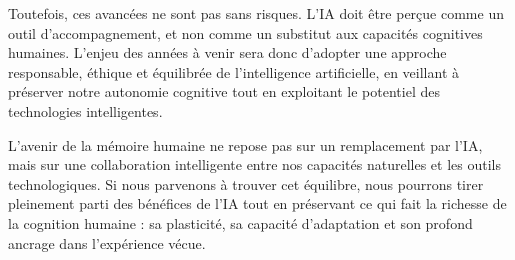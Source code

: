 \documentclass[12pt,a4paper]{report}
\begin{document}
Toutefois, ces avancées ne sont pas sans risques. L’IA doit être perçue comme un outil d’accompagnement, et non comme un substitut aux capacités cognitives humaines. L’enjeu des années à venir sera donc d’adopter une approche responsable, éthique et équilibrée de l’intelligence artificielle, en veillant à préserver notre autonomie cognitive tout en exploitant le potentiel des technologies intelligentes.

L’avenir de la mémoire humaine ne repose pas sur un remplacement par l’IA, mais sur une collaboration intelligente entre nos capacités naturelles et les outils technologiques. Si nous parvenons à trouver cet équilibre, nous pourrons tirer pleinement parti des bénéfices de l’IA tout en préservant ce qui fait la richesse de la cognition humaine : sa plasticité, sa capacité d’adaptation et son profond ancrage dans l’expérience vécue.



\end{document}
